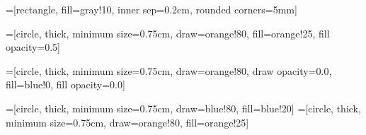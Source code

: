\newcommand{\putgraphic}[4]{%
\begin{figure}
\begin{center}
	\texttt{[image: \#1]}
\end{center}
	\caption{#2} \label{fig:#3}
\end{figure}}


=[rectangle,
	fill=gray!10,
	inner sep=0.2cm,
	rounded corners=5mm]

=[circle,
	thick,
	minimum size=0.75cm,
	draw=orange!80,
	fill=orange!25,
	fill opacity=0.5]

=[circle,
	thick,
	minimum size=0.75cm,
	draw=orange!80,
	draw opacity=0.0,
	fill=blue!0,
	fill opacity=0.0]

=[circle,
	thick,
	minimum size=0.75cm,
	draw=blue!80,
	fill=blue!20]
=[circle,
	thick,
	minimum size=0.75cm,
	draw=orange!80,
	fill=orange!25]



\newcommand{\vocab}{\mathbf{v}}
\newcommand{\dtvec}{\mathbf{t}_\Delta}
\newcommand{\ctxvec}{\mathbf{t}_\text{ctx}}
\newcommand{\dt}{\Delta_t}
\newcommand{\prerror}{Pr_{error}}
\newcommand{\weights}{\mathbf{w}}
\newcommand{\X}{\mathbf{X}}
\newcommand{\post}{\rho}
\renewcommand{\t}{t}
\newcommand{\w}{w}

\newcommand{\Prerror}{Pr_{\text{error}}}

\newcommand{\Z}{\mathbf{Z}}
\newcommand{\W}{\mathbf{W}}
